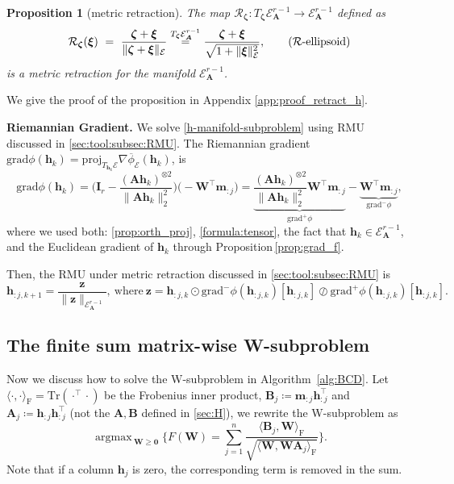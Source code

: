 \documentclass[sn-mathphys-num]{sn-jnl}
\DeclareMathOperator*{\argmax}{\textrm{argmax}\,} %
\def\grad            {\textrm{grad}}     %
\def\proj            {\textrm{proj}}     %
\def\tr              {\textrm{Tr}}       %
\def\zeros           {\bm{0}}            %
\def\A {\bm{A}}
\def\B {\bm{B}}
\def\I {\bm{I}}
\def\W {\bm{W}}
\def\h {\bm{h}}
\def\m {\bm{m}}
\def\z {\bm{z}}
\def\cE { \mathcal{E}}
\def\cR { \mathcal{R}}
\def\bzeta    {\boldsymbol{\zeta}}
\def\bxi      {\boldsymbol{\xi}}
\newtheorem{proposition}[theorem]{Proposition}
\begin{document}
\begin{proposition}[metric retraction]\label{prop:restract_h}
The map $\cR_{\bzeta}:T_{\bzeta}\cE_{\A}^{r-1}\rightarrow \cE_{\A}^{r-1}$ defined as 
\begin{equation}\label{prop:retract_ellipse}
\cR_{\bzeta}(\bxi) 
~=~
\dfrac{\bzeta + \bxi}{\| \bzeta + \bxi \|_\cE}
\overset{T_{\bzeta}\cE_{\A}^{r-1}}{~=~} 
\dfrac{\bzeta + \bxi}{\sqrt{1 + \| \bxi\|_\cE^2}},
\tag{$\cR$-ellipsoid}
\end{equation}
is a metric retraction for the manifold $\cE_{\A}^{r-1}$.  
\end{proposition}
We give the proof of the proposition in Appendix \ref{app:proof_retract_h}.



\noindent\textbf{Riemannian Gradient.}
We solve \eqref{h-manifold-subproblem} using RMU discussed in \textsection\ref{sec:tool:subsec:RMU}.
The Riemannian gradient 
$\grad \phi(\h_k) = \proj_{T_{\h_k}\cE} \nabla \overline{\phi}_{\cE}(\h_k)$, is
\[
\grad \phi(\h_k)
=
\bigg(\I_r-\dfrac{(\A\h_k)^{\otimes 2}}{\|\A\h_k\|_2^2}\bigg)
\Big(- \W^\top \m_{:j} \Big)
= 
\underbrace{
\dfrac{(\A\h_k)^{\otimes 2}}{\|\A \h_k\|_2^2} \W^\top\m_{:j}}_{\grad^+ \phi}
- 
\underbrace{
\W^\top
\m_{:j}
}_{\grad^- \phi},
\]
where we used both: \eqref{prop:orth_proj}, \eqref{formula:tensor}, the fact that $\h_k \in \cE_{\A}^{r-1}$, and the Euclidean gradient of $\h_k$ through Proposition\,\ref{prop:grad_f}.

Then, the RMU under metric retraction discussed in \textsection\ref{sec:tool:subsec:RMU} is 
\[
\h_{:j,k+1} = \dfrac{\z}{\| \z \|_{\cE_{\A}^{r-1}}},
~\text{where}~
\z = \h_{:j,k} \odot \grad^- \phi(\h_{:j,k})[\h_{:j,k}] \oslash  \grad^+ \phi(\h_{:j,k})[\h_{:j,k}]
.
\]














\subsection{The finite sum matrix-wise W-subproblem}\label{sec:W}
Now we discuss how to solve the W-subproblem in Algorithm~\ref{alg:BCD}.
Let $\langle \cdot,\cdot\rangle_\textrm{F} = \tr(\cdot^\top \cdot)$ be the Frobenius inner product, $\B_j \coloneqq \m_{:j} \h_{:j}^\top$ and $\A_j \coloneqq \h_{:j}\h_{:j}^\top$ (not the $\A,\B$ defined in \textsection\ref{sec:H}),
we rewrite the W-subproblem as
\begin{equation}\label{W-subproblem}
\displaystyle \argmax_{\W\geq \zeros}
\bigg\{
F(\W) =
\sum_{j=1}^n
\dfrac{\langle \B_j , \W \rangle_\textrm{F}}
{\sqrt{\langle \W, \W \A_j \rangle_\textrm{F}}}
\bigg\}.
\tag{W-subproblem}
\end{equation}
Note that if a column $\h_j$ is zero, the corresponding term is removed in the sum.
\end{document}
